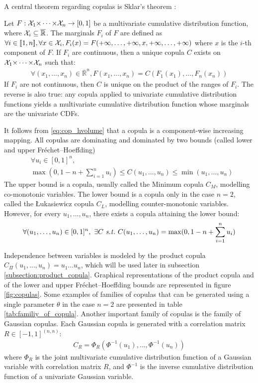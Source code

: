 A central theorem regarding copulas is Sklar's theorem \cite{sklar_fonctions_1959}:
\begin{theorem}\label{theorem:sklar}
    Let $F:{\mathcal{X}}_1{\times\dots\times}{\mathcal{X}}_n\rightarrow[0,1]$ be a multivariate cumulative distribution function, where ${\mathcal{X}}_i\subseteq\overline{\mathbb{R}}$. The marginals $F_i$ of $F$ are defined as $\forall i\in{[\![} 1,n{]\!]} , \forall x\in{\mathcal{X}}_i, F_i(x) = F( +\infty, \dots,  +\infty, x,  +\infty, \dots, +\infty)$ where $x$ is the $i$-th component of $F$. If $F_i$ are continuous, then a unique copula $C$ exists on ${\mathcal{X}}_1{\times\dots\times}{\mathcal{X}}_n$ such that:
    \begin{eqnarray}
        \forall (x_1,\dots,x_n)\in \overline{\mathbb{R}}^n, F(x_1,\dots,x_n)=C(F_1(x_1),\dots, F_n(x_n))
    \end{eqnarray}
    If $F_i$ are not continuous, then $C$ is unique on the product of the ranges of $F_i$.
    The reverse is also true: any copula applied to univariate cumulative distribution functions yields a multivariate cumulative distribution function whose marginals are the univariate CDFs.
\end{theorem}

It follows from \eqref{eq:cop_hvolume} that a copula is a component-wise increasing mapping. All copulas are dominating and dominated by two bounds (called lower and upper Fréchet–Hoeffding)
\begin{align}
    &\forall u_i \in [0,1]^n,\nonumber\\
    &\max(0, 1-n+\sum_{i=1}^n u_i) \leqslant C(u_1,\dots,u_n) \leqslant \min(u_1, \dots, u_n)
\end{align}
The upper bound is a copula, usually called the Minimum copula $C_M$, modelling co-monotonic variables. The lower bound is a copula only in the case $n=2$, called the \L ukasiewicz copula $C_L$, modelling counter-monotonic variables. However, for every $u_1,\dots,u_n$, there exists a copula attaining the lower bound:
\begin{eqnarray*}
    \forall (u_1,\dots,u_n)\in[0,1]^n,~\exists C \text{ \st }~C(u_1,\dots,u_n) = \max(0, 1-n+\sum_{i=1}^n u_i)
\end{eqnarray*}

Independence between variables is modeled by the product copula $C_\Pi(u_1, \dots, u_n)=u_1\dots u_n$, which will be used later in subsection \ref{subsection:product_copula}. Graphical representations of the product copula and of the lower and upper Fréchet–Hoeffding bounds are represented in figure \ref{fig:copulas}. Some examples of families of copulas that can be generated using a single parameter $\theta$ in the case $n=2$ are presented in table \ref{tab:familiy_of_copula}. Another important family of copulas is the family of Gaussian copulas. Each Gaussian copula is generated with a correlation matrix $R\in[-1,1]^{(n,n)}$:
\begin{align}
    C_R=\Phi_R(\Phi^{-1}(u_1), \dots, \Phi^{-1}(u_n)) \label{eq:gaussian_copula}
\end{align} where $\Phi_R$ is the joint multivariate cumulative distribution function of a Gaussian variable with correlation matrix $R$, and $\Phi^{-1}$ is the inverse cumulative distribution function of a univariate Gaussian variable. 


